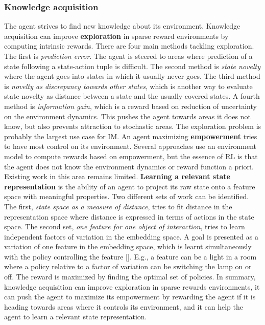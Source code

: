 \documentclass[conference]{IEEEtran}
\begin{document}
\subsubsection{Knowledge acquisition} \label{subsubsec:knowledge_acquisition}
The agent strives to find new knowledge about its environment. Knowledge acquisition can improve \textbf{exploration} in sparse reward environments by computing intrinsic rewards. There are four main methods tackling exploration. The first is \textit{prediction error}. The agent is steered to areas where prediction of a state following a state-action tuple is difficult. The second method is \textit{state novelty} where the agent goes into states in which it usually never goes. The third method is \textit{novelty as discrepancy towards other states}, which is another way to evaluate state novelty as distance between a state and the usually covered states. A fourth method is \textit{information gain}, which is a reward based on reduction of uncertainty on the environment dynamics. This pushes the agent towards areas it does not know, but also prevents attraction to stochastic areas. The exploration problem is probably the largest use case for IM. An agent maximizing \textbf{empowerment} tries to have most control on its environment. Several approaches use an environment model to compute rewards based on empowerment, but the essence of RL is that the agent does not know the environment dynamics or reward function a priori. Existing work in this area remains limited. \textbf{Learning a relevant state representation} is the ability of an agent to project its raw state  onto a feature space with meaningful properties. Two different sets of work can be identified. The first, \textit{state space as a measure of distance}, tries to fit distance in the representation space where distance is expressed in terms of actions in the state space. The second set, \textit{one feature for one object of interaction}, tries to learn independent factors of variation in the embedding space. A goal is presented as a variation of one feature in the embedding space, which is learnt simultaneously with the policy controlling the feature [\cite{thomas2017independently}]. E.g., a feature can be a light in a room where a policy relative to a factor of variation can be switching the lamp on or off. The reward is maximized by finding the optimal set of policies. In summary, knowledge acquisition can improve exploration in sparse rewards environments, it can push the agent to maximize its empowerment by rewarding the agent if it is heading towards areas where it controls its environment, and it can help the agent to learn a relevant state representation.
\end{document}
